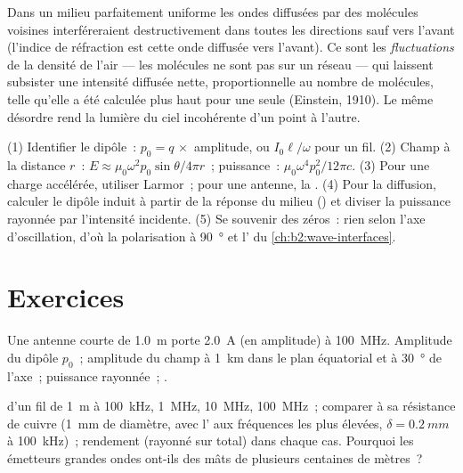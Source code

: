 \begin{remark}\label{rem:b2:dipole-radiation:why}
Dans un milieu parfaitement uniforme les ondes diffusées par des molécules
voisines interféreraient destructivement dans toutes les directions sauf vers l'avant
(l'indice de réfraction est cette onde diffusée vers l'avant). Ce sont les
\emph{fluctuations} de la densité de l'air --- les molécules ne sont pas sur un
réseau --- qui laissent subsister une intensité diffusée nette, proportionnelle au
nombre de molécules, telle qu'elle a été calculée plus haut pour une seule (Einstein, 1910). Le
même désordre rend la lumière du ciel incohérente d'un point à l'autre.
\end{remark}

\begin{method}\label{met:b2:dipole-radiation:method}
(1) Identifier le dipôle~: $p_0 = q\,\times$ amplitude, ou $I_0\ell/\omega$ pour un
fil. (2) Champ à la distance $r$~: $E \approx \mu_0\omega^2p_0\sin\theta/4\pi r$~; puissance~:
$\mu_0\omega^4p_0^2/12\pi c$. (3) Pour une charge accélérée, utiliser Larmor~; pour
une antenne, la . (4) Pour la diffusion, calculer le
dipôle induit à partir de la réponse du milieu () et diviser
la puissance rayonnée par l'intensité incidente. (5) Se souvenir des zéros~:
rien selon l'axe d'oscillation, d'où la polarisation à
\qty{90}{\degree} et l' du \cref{ch:b2:wave-interfaces}.
\end{method}

\section{Exercices}

\begin{exercise}[$\star$]\label{exo:b2:dipole-radiation:1}
Une antenne courte de \qty{1.0}{m} porte \qty{2.0}{A} (en amplitude) à
\qty{100}{MHz}. Amplitude du dipôle $p_0$~; amplitude du champ à \qty{1}{km} dans le
plan équatorial et à \qty{30}{\degree} de l'axe~; puissance rayonnée~;
.
\end{exercise}

\begin{exercise}[$\star$]\label{exo:b2:dipole-radiation:2}
 d'un fil de \qty{1}{m} à \qty{100}{kHz}, \qty{1}{MHz},
\qty{10}{MHz}, \qty{100}{MHz}~; comparer à sa résistance de cuivre
(\qty{1}{mm} de diamètre, avec l' aux fréquences les plus élevées,
$\delta = \qty{0.2}{mm}$ à \qty{100}{kHz})~; rendement (rayonné sur total)
dans chaque cas. Pourquoi les émetteurs grandes ondes ont-ils des mâts de plusieurs centaines
de mètres~?
\end{exercise}

